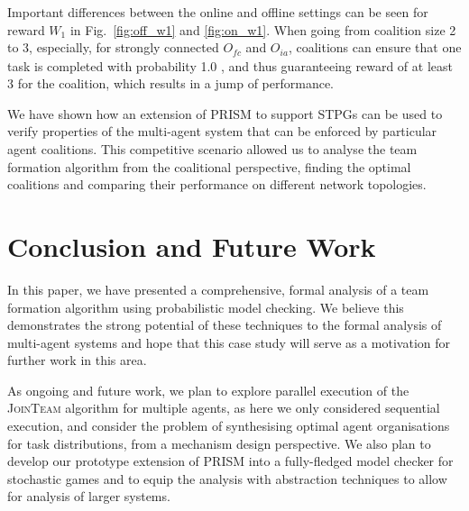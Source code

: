 \documentclass{llncs}
\begin{document}
Important differences between the online and offline settings can be seen for reward $W_1$ in Fig.~\ref{fig:off_w1} and \ref{fig:on_w1}. When going from coalition size 2 to 3, especially, for strongly connected $O_{\mathit{fc}}$ and $O_{ia}$, coalitions can ensure that one task is completed with probability 1.0
, and thus guaranteeing reward of at least 3 for the coalition, which results in a jump of performance.

We have shown how an extension of PRISM to support STPGs can be used to verify properties of the multi-agent system that can be enforced by particular agent coalitions. This competitive  scenario allowed us to analyse the team formation algorithm from the coalitional perspective, finding the optimal coalitions and comparing their performance on different network topologies.

\section{Conclusion and Future Work}
In this paper, we have presented a comprehensive, formal analysis of a team formation algorithm using probabilistic model checking. We believe this demonstrates the strong potential of these techniques to the formal analysis of multi-agent systems and hope that this case study will serve as a motivation for further work in this area.

As ongoing and future work,
we plan to explore parallel execution of the \textsc{JoinTeam} algorithm for multiple agents, as here we only considered sequential execution, and consider the problem of synthesising optimal agent organisations for task distributions, from a mechanism design perspective.
We also plan to develop our prototype extension of PRISM
into a fully-fledged model checker for stochastic games
and to equip the analysis with abstraction techniques to allow for analysis of larger systems.

\end{document}
